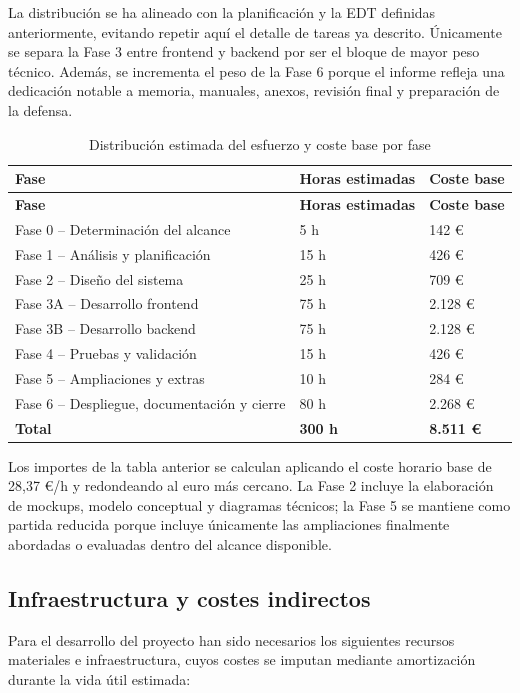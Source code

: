 La distribución se ha alineado con la planificación y la EDT definidas anteriormente, evitando repetir aquí el detalle de tareas ya descrito. Únicamente se separa la Fase 3 entre frontend y backend por ser el bloque de mayor peso técnico. Además, se incrementa el peso de la Fase 6 porque el informe refleja una dedicación notable a memoria, manuales, anexos, revisión final y preparación de la defensa.

\begin{longtable}{p{6.5cm}p{3cm}p{3.5cm}}
\caption{Distribución estimada del esfuerzo y coste base por fase}\label{tab:distribucion_esfuerzo}\\
\toprule
\textbf{Fase} & \textbf{Horas estimadas} & \textbf{Coste base} \\
\midrule
\endfirsthead
\toprule
\textbf{Fase} & \textbf{Horas estimadas} & \textbf{Coste base} \\
\midrule
\endhead
\bottomrule
\endlastfoot
Fase 0 -- Determinación del alcance & 5 h & 142 € \\
Fase 1 -- Análisis y planificación & 15 h & 426 € \\
Fase 2 -- Diseño del sistema & 25 h & 709 € \\
Fase 3A -- Desarrollo frontend & 75 h & 2.128 € \\
Fase 3B -- Desarrollo backend & 75 h & 2.128 € \\
Fase 4 -- Pruebas y validación & 15 h & 426 € \\
Fase 5 -- Ampliaciones y extras & 10 h & 284 € \\
Fase 6 -- Despliegue, documentación y cierre & 80 h & 2.268 € \\
\midrule
\textbf{Total} & \textbf{300 h} & \textbf{8.511 €} \\
\end{longtable}

Los importes de la tabla anterior se calculan aplicando el coste horario base de 28,37 €/h y redondeando al euro más cercano. La Fase 2 incluye la elaboración de mockups, modelo conceptual y diagramas técnicos; la Fase 5 se mantiene como partida reducida porque incluye únicamente las ampliaciones finalmente abordadas o evaluadas dentro del alcance disponible.

\subsection{Infraestructura y costes indirectos}

Para el desarrollo del proyecto han sido necesarios los siguientes recursos materiales e infraestructura, cuyos costes se imputan mediante amortización durante la vida útil estimada:

